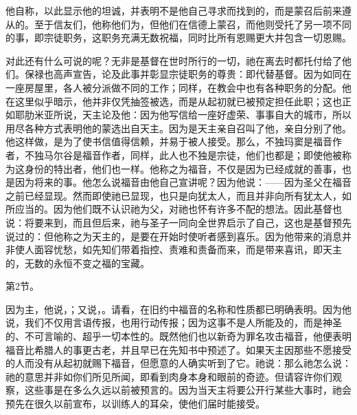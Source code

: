  他自称，以此显示他的坦诚，并表明不是他自己寻求而找到的，而是蒙召后前来遵从的。至于信友们，他称他们为，但他们在信德上蒙召，而他则受托了另一项不同的事，即宗徒职务，这职务充满无数祝福，同时比所有恩赐更大并包含一切恩赐。\par

对此还有什么可说的呢？无非是基督在世时所行的一切，祂在离去时都托付给了他们。保禄也高声宣告，论及此事并彰显宗徒职务的尊贵：即代替基督。因为如同在一座房屋里，各人被分派做不同的工作；同样，在教会中也有各种职务的分配。他在这里似乎暗示，他并非仅凭抽签被选，而是从起初就已被预定担任此职；这也正如耶肋米亚所说，天主论及他：因为他写信给一座好虚荣、事事自大的城市，所以用尽各种方式表明他的蒙选出自天主。因为是天主亲自召叫了他，亲自分别了他。他这样做，是为了使书信值得信赖，并易于被人接受。那么，不独玛窦是福音作者，不独马尔谷是福音作者，同样，此人也不独是宗徒，他们也都是；即使他被称为这身份的特出者，他们也一样。他称之为福音，不仅是因为已经成就的善事，也是因为将来的事。他怎么说福音由他自己宣讲呢？因为他说：——因为圣父在福音之前已经显现。然而即使祂已显现，也只是向犹太人，而且并非向所有犹太人，如所应当的。因为他们既不认识祂为父，对祂也怀有许多不配的想法。因此基督也说：将要来到，而且但后来，祂与圣子一同向全世界启示了自己，这也是基督预先说过的：但他称之为天主的，是要在开始时使听者感到喜乐。因为他带来的消息并非使人面容忧愁，如先知们带着指控、责难和责备而来，而是带来喜讯，即天主的，无数的永恒不变之福的宝藏。\par

第2节。\par

因为主，他说，；又说，。请看，在旧约中福音的名称和性质都已明确表明。因为他说，我们不仅用言语传报，也用行动传报；因为这事不是人所能及的，而是神圣的、不可言喻的、超乎一切本性的。既然他们也以新奇为罪名攻击福音，他便表明福音比希腊人的事更古老，并且早已在先知书中预述了。如果天主因那些不愿接受的人而没有从起初就赐下福音，但愿意的人确实听到了它。祂说：那么祂怎么说：祂的意思并非如你们所见所闻，即看到肉身本身和眼前的奇迹。但请容许你们观察，这些事是在多么久远以前被预言的。因为当天主将要公开行某些大事时，祂会预先在很久以前宣布，以训练人的耳朵，使他们届时能接受。\par

